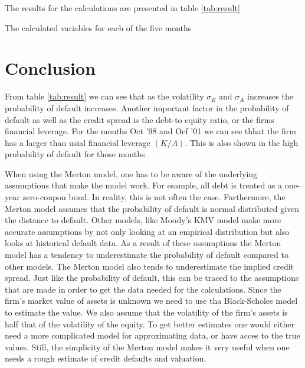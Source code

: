 \documentclass[a4paper]{article}
\begin{document}
The results for the calculations are presented in table \ref{tab:result}
\begin{table}[H]
    \centering
    \caption{The calculated variables for each of the five months}
    \label{tab:result}
    
\end{table}

\section{Conclusion}
From table \ref{tab:result} we can see that as the volatility $\sigma_E$ and $\sigma_A$ increases the probability of default increases. Another important factor in the probability of default as well as the credit spread is the debt-to equity ratio, or the firms financial leverage. For the months Oct '98 and Ocf '01 we can see thhat the firm has a larger than usial financial leverage $(K/A)$. This is also shown in the high probability of default for those months.

When using the Merton model, one has to be aware of the underlying assumptions that make the model work. For esample, all debt is treated as a one-year zero-coupon bond. In reality, this is not often the case. Furthermore, the Merton model assumes that the probability of default is normal distributed given the distance to default. Other models, like Moody's KMV model make more accurate assumptions by not only looking at an empirical distribution but also looks at historical default data. As a result of these assumptions the Merton model has a tendency to underestimate the probability of default compared to other models. The Merton model also tends to underestimate the implied credit spread. Just like the probability of default, this can be traced to the assumptions that are made in order to get the data needed for the calculations. Since the firm's market value of assets is unknown we need to use tha Black-Scholes model to estimate the value. We also assume that the volatility of the firm's assets is half that of the volatility of the equity. To get better estimates one would either need a more complicated model for approximating data, or have acces to the true values. Still, the simplicity of the Merton model makes it very useful when one needs a rough estimate of credit defaults and valuation.
\end{document}
